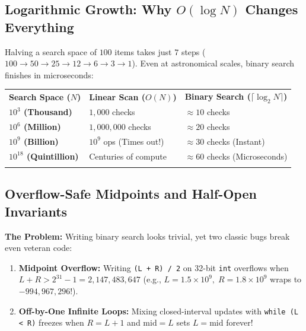 \documentclass[11pt,a4paper]{article}
\theoremstyle{definition}
\newcommand{\painbeat}{\textbf{\color{accentamber}The Problem:} }
\begin{document}
\subsection{Logarithmic Growth: Why \texorpdfstring{$O(\log N)$}{O(log N)} Changes Everything}

Halving a search space of $100$ items takes just $7$ steps ($100 \to 50 \to 25 \to 12 \to 6 \to 3 \to 1$). Even at astronomical scales, binary search finishes in microseconds:

\begingroup\small{}
\begin{tabularx}{\textwidth}{>{\raggedright\arraybackslash\bfseries}p{3.6cm} >{\raggedright\arraybackslash}p{4.3cm} >{\raggedright\arraybackslash}X}
\arrayrulecolor{primaryblue}\toprule[1.2pt]
\rowcolor{primaryblue!10}
\textcolor{primaryblue}{\textbf{Search Space ($N$)}} & \textcolor{primaryblue}{\textbf{Linear Scan ($O(N)$)}} & \textcolor{primaryblue}{\textbf{Binary Search ($\lceil \log_2 N \rceil$)}} \\
\arrayrulecolor{codeframe}\midrule[0.6pt]
$10^3$ (Thousand) & $1{,}000$ checks & $\approx 10$ checks \\
$10^6$ (Million) & $1{,}000{,}000$ checks & $\approx 20$ checks \\
$10^9$ (Billion) & $10^9$ ops (Times out!) & $\approx 30$ checks (Instant) \\
$10^{18}$ (Quintillion) & Centuries of compute & $\approx 60$ checks (Microseconds) \\
\arrayrulecolor{primaryblue}\bottomrule[1.2pt]
\end{tabularx}\endgroup

\subsection{Overflow-Safe Midpoints and Half-Open Invariants}

\painbeat Writing binary search looks trivial, yet two classic bugs break even veteran code:
\begin{enumerate}
    \item \textbf{Midpoint Overflow:} Writing \texttt{(L + R) / 2} on 32-bit \texttt{int} overflows when $L + R > 2^{31} - 1 = 2{,}147{,}483{,}647$ (e.g., $L = 1.5 \times 10^9,\; R = 1.8 \times 10^9$ wraps to $-994{,}967{,}296$!).
    \item \textbf{Off-by-One Infinite Loops:} Mixing closed-interval updates with \texttt{while (L < R)} freezes when $R = L + 1$ and $\text{mid} = L$ sets $L = \text{mid}$ forever!
\end{enumerate}
\end{document}
